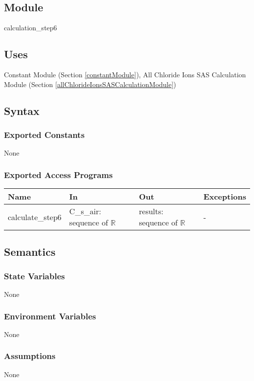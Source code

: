 \documentclass[12pt, titlepage]{article}
\begin{document}
\subsection{Module}
calculation\_step6

\subsection{Uses}

Constant Module (Section \ref{constantModule}), All Chloride Ions SAS Calculation Module (Section \ref{allChlorideIonsSASCalculationModule})

\subsection{Syntax}

\subsubsection{Exported Constants}
None
\subsubsection{Exported Access Programs}

\begin{center}
\begin{tabular}{p{2.5cm} p{4.5cm} p{5cm} p{2cm}}
\hline
\textbf{Name} & \textbf{In} & \textbf{Out} & \textbf{Exceptions} \\
\hline
calculate\_step6 & C\_s\_air: sequence of $\mathbb{R}$ & results: sequence of $\mathbb{R}$ & - \\

\hline
\end{tabular}
\end{center}

\subsection{Semantics}

\subsubsection{State Variables}
None

\subsubsection{Environment Variables}
None
\subsubsection{Assumptions}
None
\end{document}
